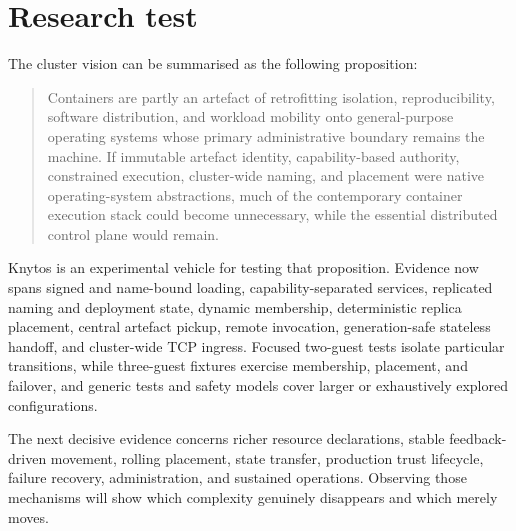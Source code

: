 \section{Research test}

The cluster vision can be summarised as the following proposition:

\begin{quote}
    Containers are partly an artefact of retrofitting isolation,
    reproducibility, software distribution, and workload mobility onto
    general-purpose operating systems whose primary administrative boundary
    remains the machine. If immutable artefact identity, capability-based
    authority, constrained execution, cluster-wide naming, and placement were
    native operating-system abstractions, much of the contemporary container
    execution stack could become unnecessary, while the essential
    distributed control plane would remain.
\end{quote}

Knytos is an experimental vehicle for testing that proposition. Evidence
now spans signed and name-bound loading, capability-separated services,
replicated naming and deployment state, dynamic membership, deterministic
replica placement, central artefact pickup, remote invocation,
generation-safe stateless handoff, and cluster-wide TCP ingress. Focused
two-guest tests isolate particular transitions, while three-guest fixtures exercise
membership, placement, and failover, and generic tests and safety models cover
larger or exhaustively explored configurations.

The next decisive evidence concerns richer resource declarations, stable
feedback-driven movement, rolling placement, state transfer, production trust
lifecycle, failure recovery, administration, and sustained operations.
Observing those mechanisms will show which complexity genuinely disappears and
which merely moves.

\endinput
